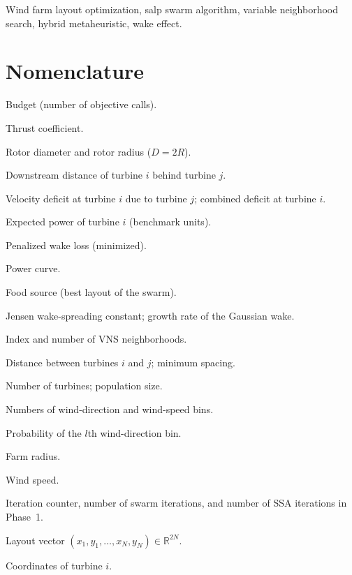 \documentclass[journal,twoside]{IEEEtran}
\begin{document}
\begin{IEEEkeywords}
Wind farm layout optimization, salp swarm algorithm, variable neighborhood search, hybrid metaheuristic, wake effect.
\end{IEEEkeywords}

\section*{Nomenclature}
\begin{IEEEdescription}
\item[$B$] Budget (number of objective calls).
\item[$C_T$] Thrust coefficient.
\item[$D$, $R$] Rotor diameter and rotor radius ($D=2R$).
\item[$d_{ij}$] Downstream distance of turbine $i$ behind turbine $j$.
\item[$\Delta_{ij}$, $\Delta_i$] Velocity deficit at turbine $i$ due to turbine $j$; combined deficit at turbine $i$.
\item[$E(P_i)$] Expected power of turbine $i$ (benchmark units).
\item[$F_p$] Penalized wake loss (minimized).
\item[$f(s)$] Power curve.
\item[$\mathbf H$] Food source (best layout of the swarm).
\item[$K$, $K_{\rm G}$] Jensen wake-spreading constant; growth rate of the Gaussian wake.
\item[$k$, $k_{\max}$] Index and number of VNS neighborhoods.
\item[$\ell_{ij}$, $\ell_{\min}$] Distance between turbines $i$ and $j$; minimum spacing.
\item[$N$, $N_p$] Number of turbines; population size.
\item[$N_\theta$, $N_s$] Numbers of wind-direction and wind-speed bins.
\item[$p_l$] Probability of the $l$th wind-direction bin.
\item[$r$] Farm radius.
\item[$s$] Wind speed.
\item[$t$, $T$, $T_1$] Iteration counter, number of swarm iterations, and number of SSA iterations in Phase~1.
\item[$\mathbf X$] Layout vector $(x_1,y_1,\ldots,x_N,y_N)\in\mathbb R^{2N}$.
\item[$x_i$, $y_i$] Coordinates of turbine $i$.

\end{IEEEdescription}
\end{document}
